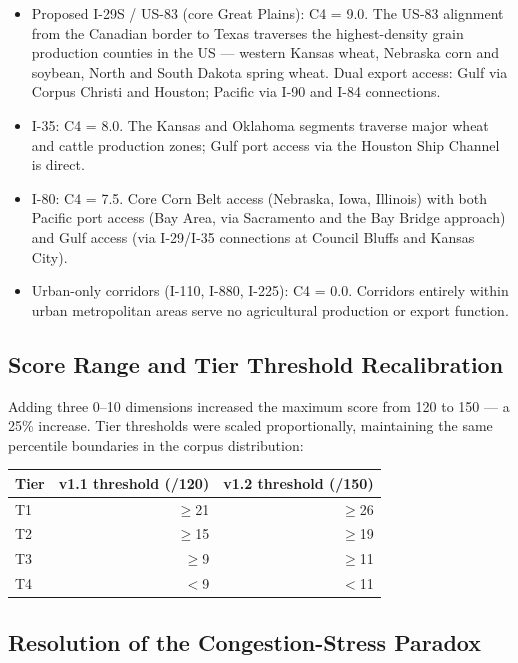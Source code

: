 \begin{itemize}
  \item Proposed I-29S / US-83 (core Great Plains): C4 = 9.0. The US-83 alignment from the Canadian border to Texas traverses the highest-density grain production counties in the US --- western Kansas wheat, Nebraska corn and soybean, North and South Dakota spring wheat. Dual export access: Gulf via Corpus Christi and Houston; Pacific via I-90 and I-84 connections.
  \item I-35: C4 = 8.0. The Kansas and Oklahoma segments traverse major wheat and cattle production zones; Gulf port access via the Houston Ship Channel is direct.
  \item I-80: C4 = 7.5. Core Corn Belt access (Nebraska, Iowa, Illinois) with both Pacific port access (Bay Area, via Sacramento and the Bay Bridge approach) and Gulf access (via I-29/I-35 connections at Council Bluffs and Kansas City).
  \item Urban-only corridors (I-110, I-880, I-225): C4 = 0.0. Corridors entirely within urban metropolitan areas serve no agricultural production or export function.
\end{itemize}

\subsection{Score Range and Tier Threshold Recalibration}

Adding three 0--10 dimensions increased the maximum score from 120 to 150 --- a 25\% increase. Tier thresholds were scaled proportionally, maintaining the same percentile boundaries in the corpus distribution:

\begin{center}
\begin{tabular}{lrr}
\toprule
\textbf{Tier} & \textbf{v1.1 threshold (/120)} & \textbf{v1.2 threshold (/150)} \\
\midrule
T1 & $\geq$21 & $\geq$26 \\
T2 & $\geq$15 & $\geq$19 \\
T3 & $\geq$9  & $\geq$11 \\
T4 & $<$9     & $<$11  \\
\bottomrule
\end{tabular}
\end{center}

\subsection{Resolution of the Congestion-Stress Paradox}


